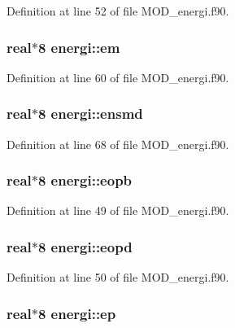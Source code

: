 Definition at line 52 of file M\-O\-D\-\_\-energi.\-f90.

\hypertarget{classenergi_ae647bdb19dc415c1a53266e17340ee6b}{
\subsubsection[{em}]{\setlength{\rightskip}{0pt plus 5cm}real$\ast$8 energi\-::em}}\label{classenergi_ae647bdb19dc415c1a53266e17340ee6b}


Definition at line 60 of file M\-O\-D\-\_\-energi.\-f90.

\hypertarget{classenergi_ae7c5bfdf9b27be0c3dcf0b02233d39d4}{
\subsubsection[{ensmd}]{\setlength{\rightskip}{0pt plus 5cm}real$\ast$8 energi\-::ensmd}}\label{classenergi_ae7c5bfdf9b27be0c3dcf0b02233d39d4}


Definition at line 68 of file M\-O\-D\-\_\-energi.\-f90.

\hypertarget{classenergi_ad21d857824fcf48e4bb6e2e75eecbf07}{
\subsubsection[{eopb}]{\setlength{\rightskip}{0pt plus 5cm}real$\ast$8 energi\-::eopb}}\label{classenergi_ad21d857824fcf48e4bb6e2e75eecbf07}


Definition at line 49 of file M\-O\-D\-\_\-energi.\-f90.

\hypertarget{classenergi_a11375c6c5245048a2be654192e8ad678}{
\subsubsection[{eopd}]{\setlength{\rightskip}{0pt plus 5cm}real$\ast$8 energi\-::eopd}}\label{classenergi_a11375c6c5245048a2be654192e8ad678}


Definition at line 50 of file M\-O\-D\-\_\-energi.\-f90.

\hypertarget{classenergi_a141a83a1bafc312717634cbb6dbb8352}{
\subsubsection[{ep}]{\setlength{\rightskip}{0pt plus 5cm}real$\ast$8 energi\-::ep}}\label{classenergi_a141a83a1bafc312717634cbb6dbb8352}


